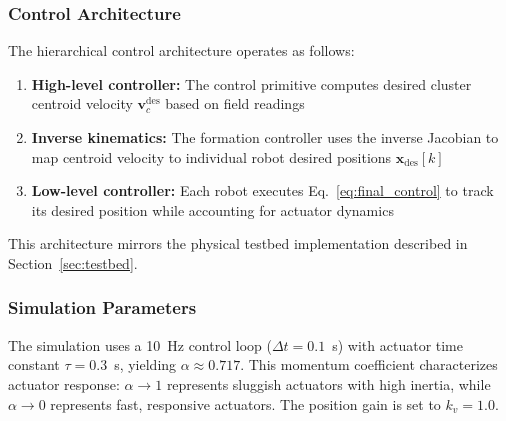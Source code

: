 \subsubsection{Control Architecture}

The hierarchical control architecture operates as follows:
\begin{enumerate}
    \item \textbf{High-level controller:} The control primitive computes desired cluster centroid velocity $\mathbf{v}_c^{\text{des}}$ based on field readings
    \item \textbf{Inverse kinematics:} The formation controller uses the inverse Jacobian to map centroid velocity to individual robot desired positions $\mathbf{x}_{\text{des}}[k]$
    \item \textbf{Low-level controller:} Each robot executes Eq.~\eqref{eq:final_control} to track its desired position while accounting for actuator dynamics
\end{enumerate}

This architecture mirrors the physical testbed implementation described in Section~\ref{sec:testbed}.

\subsubsection{Simulation Parameters}

The simulation uses a 10~Hz control loop ($\Delta t = 0.1$~s) with actuator time constant $\tau = 0.3$~s, yielding $\alpha \approx 0.717$. This momentum coefficient characterizes actuator response: $\alpha \to 1$ represents sluggish actuators with high inertia, while $\alpha \to 0$ represents fast, responsive actuators. The position gain is set to $k_v = 1.0$.
